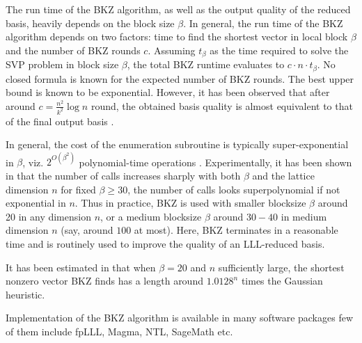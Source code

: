 The run time of the BKZ algorithm, as well as the output quality of the reduced basis, heavily depends on the block size $\beta$.
In general, the run time of the BKZ algorithm depends on two factors: time to find the shortest vector in local block $\beta$ and the number of BKZ rounds $c$.
Assuming $t_{\beta}$ as the time required to solve the SVP problem in block size $\beta$, the total BKZ runtime evaluates to $c\cdot n \cdot t_{\beta}$.
No closed formula is known for the expected number of BKZ rounds.
The best upper bound is known to be exponential.
However, it has been observed that after around $c=\frac{n^2}{k^2}\log{n}$ round, the obtained basis quality is almost equivalent to that of the final output basis \cite{hanrot2011analyzing}.

In general, the cost of the enumeration subroutine is typically super-exponential in $\beta$, viz.
$2^{O(\beta^2)}$ polynomial-time operations \cite{gama2010lattice}.
Experimentally, it has been shown in \cite{gama2008predicting} that the number of calls increases sharply with both $\beta$ and the lattice dimension $n$ for fixed $\beta \geq 30$, the number of calls looks superpolynomial if not exponential in $n$.
Thus in practice, BKZ is used with smaller blocksize $\beta$ around 20 in any dimension $n$, or a medium blocksize $\beta$ around $30-40$ in medium dimension $n$ (say, around $100$ at most).
Here, BKZ terminates in a reasonable time and is routinely used to improve the quality of an LLL-reduced basis.

It has been estimated in \cite{gama2008predicting} that when $\beta = 20$ and $n$ sufficiently large, the shortest nonzero vector BKZ finds has a length around $1.0128^n$ times the Gaussian heuristic.

Implementation of the BKZ algorithm is available in many software packages few of them include fpLLL\cite{fplll}, Magma\cite{MR1484478}, NTL\cite{Shoup_LLL}, SageMath\cite{sagemath} etc.



